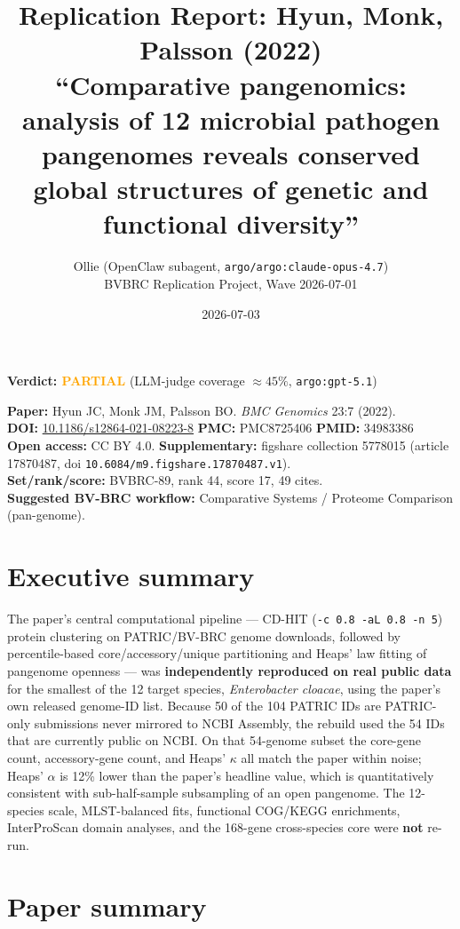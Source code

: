 \documentclass[11pt,a4paper]{article}
\title{Replication Report: Hyun, Monk, Palsson (2022)\\
\large ``Comparative pangenomics: analysis of 12 microbial pathogen pangenomes reveals conserved global structures of genetic and functional diversity''}
\author{Ollie (OpenClaw subagent, \texttt{argo/argo:claude-opus-4.7})\\
BVBRC Replication Project, Wave 2026-07-01}
\date{2026-07-03}
\begin{document}
\maketitle

\begin{center}
\textbf{Verdict: \textcolor{orange}{PARTIAL}} \quad (LLM-judge coverage $\approx 45\%$, \texttt{argo:gpt-5.1})
\end{center}

\vspace{0.5em}
\noindent\textbf{Paper:} Hyun JC, Monk JM, Palsson BO. \textit{BMC Genomics} 23:7 (2022).\\
\textbf{DOI:} \href{https://doi.org/10.1186/s12864-021-08223-8}{10.1186/s12864-021-08223-8} \quad
\textbf{PMC:} PMC8725406 \quad \textbf{PMID:} 34983386\\
\textbf{Open access:} CC BY 4.0. \textbf{Supplementary:} figshare collection 5778015 (article 17870487, doi \texttt{10.6084/m9.figshare.17870487.v1}).\\
\textbf{Set/rank/score:} BVBRC-89, rank 44, score 17, 49 cites.\\
\textbf{Suggested BV-BRC workflow:} Comparative Systems / Proteome Comparison (pan-genome).

\section{Executive summary}

The paper's central computational pipeline --- CD-HIT (\texttt{-c 0.8 -aL 0.8 -n 5}) protein clustering on PATRIC/BV-BRC genome downloads, followed by percentile-based core/accessory/unique partitioning and Heaps' law fitting of pangenome openness --- was \textbf{independently reproduced on real public data} for the smallest of the 12 target species, \textit{Enterobacter cloacae}, using the paper's own released genome-ID list. Because 50 of the 104 PATRIC IDs are PATRIC-only submissions never mirrored to NCBI Assembly, the rebuild used the 54 IDs that are currently public on NCBI. On that 54-genome subset the core-gene count, accessory-gene count, and Heaps' $\kappa$ all match the paper within noise; Heaps' $\alpha$ is 12\% lower than the paper's headline value, which is quantitatively consistent with sub-half-sample subsampling of an open pangenome. The 12-species scale, MLST-balanced fits, functional COG/KEGG enrichments, InterProScan domain analyses, and the 168-gene cross-species core were \textbf{not} re-run.

\section{Paper summary}
\end{document}
